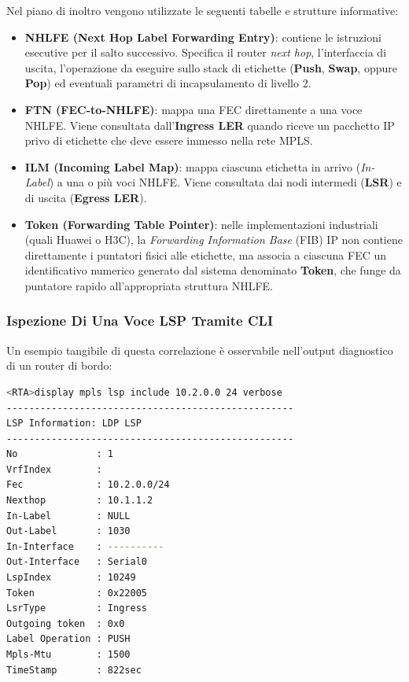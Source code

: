 \documentclass[11pt, a4paper]{article}
\begin{document}
Nel piano di inoltro vengono utilizzate le seguenti tabelle e strutture informative:
\begin{itemize}[noitemsep]
    \item \textbf{NHLFE (Next Hop Label Forwarding Entry)}: contiene le istruzioni esecutive per il salto successivo. Specifica il router \emph{next hop}, l'interfaccia di uscita, l'operazione da eseguire sullo stack di etichette (\textbf{Push}, \textbf{Swap}, oppure \textbf{Pop}) ed eventuali parametri di incapsulamento di livello 2.
    \item \textbf{FTN (FEC-to-NHLFE)}: mappa una FEC direttamente a una voce NHLFE. Viene consultata dall'\textbf{Ingress LER} quando riceve un pacchetto IP privo di etichette che deve essere immesso nella rete MPLS.
    \item \textbf{ILM (Incoming Label Map)}: mappa ciascuna etichetta in arrivo (\emph{In-Label}) a una o più voci NHLFE. Viene consultata dai nodi intermedi (\textbf{LSR}) e di uscita (\textbf{Egress LER}).
    \item \textbf{Token (Forwarding Table Pointer)}: nelle implementazioni industriali (quali Huawei o H3C), la \emph{Forwarding Information Base} (FIB) IP non contiene direttamente i puntatori fisici alle etichette, ma associa a ciascuna FEC un identificativo numerico generato dal sistema denominato \textbf{Token}, che funge da puntatore rapido all'appropriata struttura NHLFE.
\end{itemize}


\subsubsection{Ispezione Di Una Voce LSP Tramite CLI}
Un esempio tangibile di questa correlazione è osservabile nell'output diagnostico di un router di bordo:

\begin{lstlisting}[language=bash]
<RTA>display mpls lsp include 10.2.0.0 24 verbose
---------------------------------------------------
LSP Information: LDP LSP
---------------------------------------------------
No              : 1
VrfIndex        :
Fec             : 10.2.0.0/24
Nexthop         : 10.1.1.2
In-Label        : NULL
Out-Label       : 1030
In-Interface    : ----------
Out-Interface   : Serial0
LspIndex        : 10249
Token           : 0x22005
LsrType         : Ingress
Outgoing token  : 0x0
Label Operation : PUSH
Mpls-Mtu        : 1500
TimeStamp       : 822sec
\end{lstlisting}
\end{document}
